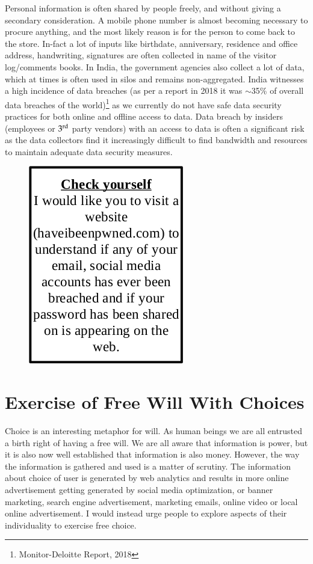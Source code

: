 \begin{multicols}{2}
Personal information is often shared by people freely, and without giving a secondary consideration. A mobile phone number is almost becoming necessary to procure anything, and the most likely reason is for the person to come back to the store. In-fact a lot of inputs like birthdate, anniversary, residence and office address, handwriting, signatures are often collected in name of the visitor log/comments books. In India, the government agencies also collect a lot of data, which at times is often used in silos and remains non-aggregated. India witnesses a high incidence of data breaches (as per a report in 2018 it was $\sim$35\% of overall data breaches of the world)\footnote{Monitor-Deloitte Report, 2018} as we currently do not have safe data security practices for both online and offline access to data. Data breach by insiders (employees or $3^{\rm rd}$ party vendors) with an access to data is often a significant risk as the data collectors find it increasingly difficult to find bandwidth and resources to maintain adequate data security measures.
\begin{figure}[H]
\centering
\includegraphics[scale=2]{src/Figures/chap2/fig01.jpg}
\vspace{-.5cm}

\end{figure}

\section{Exercise of Free Will With Choices}

Choice is an interesting metaphor for will. As human beings we are all entrusted a birth right of having a free will. We are all aware that information is power, but it is also now well established that information is also money.  However, the way the information is gathered and used is a matter of scrutiny. The information about choice of user is generated by web analytics and results in more online advertisement getting generated by social media optimization, or banner marketing, search engine advertisement, marketing emails, online video or local online advertisement. I would instead urge people to explore aspects of their individuality to exercise free choice.


\end{multicols}

